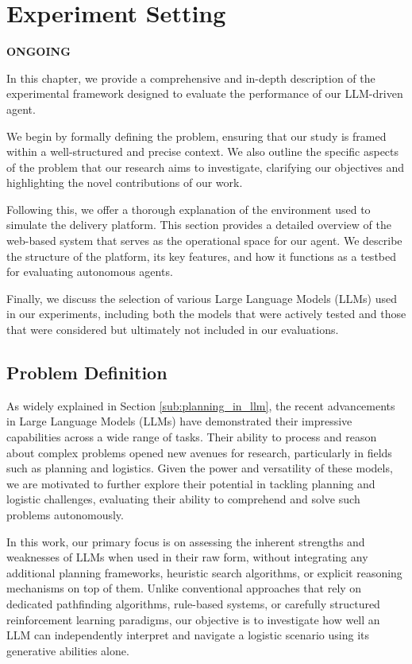 \chapter{Experiment Setting}
\label{cha:experiment_setting}

\textbf{ONGOING}

In this chapter, we provide a comprehensive and in-depth description of the experimental
framework designed to evaluate the performance of our LLM-driven agent.

We begin by formally defining the problem, ensuring that our study is framed
within a well-structured and precise context. We also outline the specific aspects
of the problem that our research aims to investigate, clarifying our objectives
and highlighting the novel contributions of our work.

Following this, we offer a thorough explanation of the environment used to simulate
the delivery platform. This section provides a detailed overview of the web-based
system that serves as the operational space for our agent. We describe the structure
of the platform, its key features, and how it functions as a testbed for evaluating
autonomous agents.

Finally, we discuss the selection of various Large Language Models (LLMs) used
in our experiments, including both the models that were actively tested and those
that were considered but ultimately not included in our evaluations.

\section{Problem Definition}
\label{sec:problem_definition}

As widely explained in Section \ref{sub:planning_in_llm}, the recent advancements
in Large Language Models (LLMs) have demonstrated their impressive capabilities across
a wide range of tasks. Their ability to process and reason about complex
problems opened new avenues for research, particularly in fields such as planning
and logistics. Given the power and versatility of these models, we are motivated
to further explore their potential in tackling planning and logistic challenges,
evaluating their ability to comprehend and solve such problems autonomously.

In this work, our primary focus is on assessing the inherent strengths and weaknesses
of LLMs when used in their raw form, without integrating any additional planning
frameworks, heuristic search algorithms, or explicit reasoning mechanisms on top
of them. Unlike conventional approaches that rely on dedicated pathfinding algorithms,
rule-based systems, or carefully structured reinforcement learning paradigms,
our objective is to investigate how well an LLM can independently interpret and
navigate a logistic scenario using its generative abilities alone.

